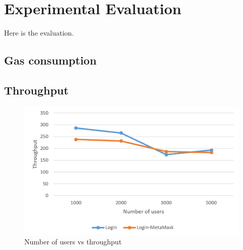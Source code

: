 \chapter{Experimental Evaluation}
\label{chapter:evaluation}

Here is the evaluation.

\section{Gas consumption}


\section{Throughput}
\begin{figure}[hb]
    \centering
    \includegraphics[height=!,width=1\linewidth,keepaspectratio=true]{figures/login-throughput.png}
    \caption{{\footnotesize Number of users vs throughput}}
    \label{fig:loginThroughput}
\end{figure}